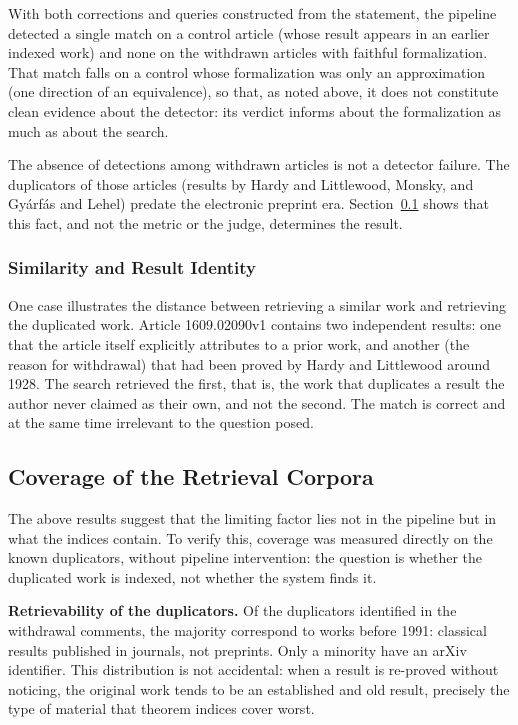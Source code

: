 \documentclass[12pt,a4paper]{article}
\theoremstyle{remark}
\begin{document}
With both corrections and queries constructed from the statement, the pipeline detected a single match on a control article (whose result appears in an earlier indexed work) and none on the withdrawn articles with faithful formalization. That match falls on a control whose formalization was only an approximation (one direction of an equivalence), so that, as noted above, it does not constitute clean evidence about the detector: its verdict informs about the formalization as much as about the search.

The absence of detections among withdrawn articles is not a detector failure. The duplicators of those articles (results by Hardy and Littlewood, Monsky, and Gyárfás and Lehel) predate the electronic preprint era. Section~\ref{ssec:cobertura} shows that this fact, and not the metric or the judge, determines the result.

\subsubsection{Similarity and Result Identity}

One case illustrates the distance between retrieving a similar work and retrieving the duplicated work. Article 1609.02090v1 contains two independent results: one that the article itself explicitly attributes to a prior work, and another (the reason for withdrawal) that had been proved by Hardy and Littlewood around 1928. The search retrieved the first, that is, the work that duplicates a result the author never claimed as their own, and not the second. The match is correct and at the same time irrelevant to the question posed.

\subsection{Coverage of the Retrieval Corpora}
\label{ssec:cobertura}

The above results suggest that the limiting factor lies not in the pipeline but in what the indices contain. To verify this, coverage was measured directly on the known duplicators, without pipeline intervention: the question is whether the duplicated work is indexed, not whether the system finds it.

\textbf{Retrievability of the duplicators.} Of the duplicators identified in the withdrawal comments, the majority correspond to works before 1991: classical results published in journals, not preprints. Only a minority have an arXiv identifier. This distribution is not accidental: when a result is re-proved without noticing, the original work tends to be an established and old result, precisely the type of material that theorem indices cover worst.
\end{document}
